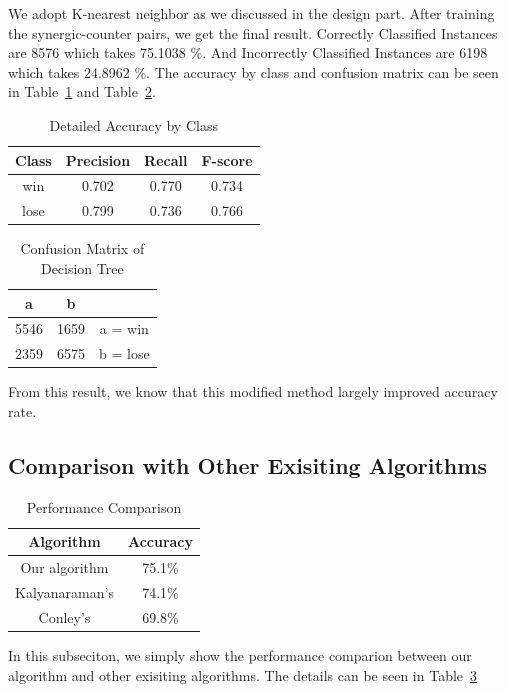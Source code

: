 We adopt K-nearest neighbor as we discussed in the design part. After training the synergic-counter pairs, we get the final result. Correctly Classified Instances are 8576 which takes 75.1038 \%. And Incorrectly Classified Instances are 6198 which takes 24.8962 \%. The accuracy by class and confusion matrix can be seen in Table~\ref{table:knnaccuracy} and Table~\ref{table:knnconfusionmatrix}.

\begin{table}
\begin{center}
\begin{tabular}{|c|c|c|c|}
\hline
Class & Precision & Recall & F-score \\ \hline
win & 0.702 & 0.770 & 0.734 \\ \hline
lose & 0.799 & 0.736 & 0.766 \\ \hline
\end{tabular}
\caption{Detailed Accuracy by Class}
\label{table:knnaccuracy}
\end{center}
\end{table}

\begin{table}
\begin{center}
\begin{tabular}{|c|c|c|}
\hline
a & b & \\ \hline
5546 & 1659 & a = win \\ \hline
2359 & 6575 & b = lose \\ \hline
\end{tabular}
\caption{Confusion Matrix of Decision Tree}
\label{table:knnconfusionmatrix}
\end{center}
\end{table}

From this result, we know that this modified method largely improved accuracy rate.

\subsection{Comparison with Other Exisiting Algorithms}

\begin{table}
\centering
\begin{tabular}{|c|c|}
\hline
Algorithm & Accuracy \\ \hline
Our algorithm & 75.1\% \\ \hline 
Kalyanaraman's & 74.1\% \\ \hline
Conley's & 69.8\% \\ \hline
\end{tabular}
\caption{Performance Comparison}
\label{table:comp}
\end{table}

In this subseciton, we simply show the performance comparion between our algorithm and other exisiting algorithms.
The details can be seen in Table~\ref{table:comp}


